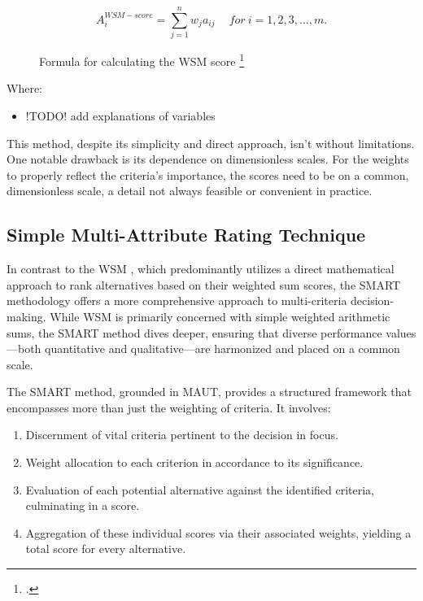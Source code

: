 \begin{figure}[h]
    \centering
    \Large
    \[ A_{i}^{WSM-score} = \sum_{j=1}^{n} w_{j} a_{ij} \quad \ for \ i = 1, 2, 3, \dots, m. \]
    \caption{Formula for calculating the \ac*{WSM} score \footcite*{WeightedSumModel2022}} 
\end{figure}

Where:
\begin{itemize}
    \item !TODO! add explanations of variables
\end{itemize}

This method, despite its simplicity and direct approach, isn't without limitations.
One notable drawback is its dependence on dimensionless scales.
For the weights to properly reflect the criteria's importance, the scores need to be on a common, dimensionless scale, a detail not always feasible or convenient in practice.

\subsection{Simple Multi-Attribute Rating Technique}

In contrast to the \ac{WSM} , which predominantly utilizes a
direct mathematical approach to rank alternatives based on their weighted sum
scores, the \ac{SMART} methodology offers a more comprehensive approach to
multi-criteria decision-making. While \ac{WSM} is primarily concerned with simple
weighted arithmetic sums, the \ac{SMART} method dives deeper, ensuring that diverse
performance values—both quantitative and qualitative—are harmonized and placed
on a common scale.

The \ac{SMART} method, grounded in \ac{MAUT}, provides a
structured framework that encompasses more than just the weighting of criteria.
It involves:

\begin{enumerate} \item Discernment of vital criteria pertinent to the decision
in focus. \item Weight allocation to each criterion in accordance to its
significance. \item Evaluation of each potential alternative against the
identified criteria, culminating in a score. \item Aggregation of these
individual scores via their associated weights, yielding a total score for every
alternative. \end{enumerate}

